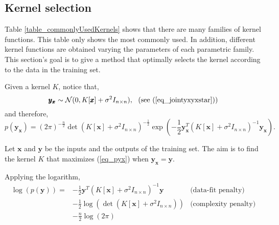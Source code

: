 \subsection{Kernel selection} \label{sec_kernelSelection}

Table \ref{table_commonlyUsedKernels} shows that there are many families of kernel functions. 
This table only shows the most commonly used. 
In addition, different kernel functions are obtained varying the parameters of each parametric family.%
This section's goal is to give a method that optimally selects the kernel according to the data in the training set.

Given a kernel $K$, notice that, %
\begin{equation*}%
  \pmb{y}_{\pmb{x}} \sim \mathcal{N}(0, K[\pmb{x}] + \sigma^2 I_{n \times n}),
 \ \ \text{(see (\ref{eq_jointyxyxstar}))}
\end{equation*}
and therefore,
\begin{equation} \label{eq_pyx}
  p(\pmb{y}_{\pmb{x}}) = (2\pi)^{-\frac{n}{2}}
       \det(K[\pmb{x}] + \sigma^2 I_{n \times n})^{-\frac{1}{2}}
       \exp\left(
           -\frac{1}{2}
           \pmb{y}_{\pmb{x}}^T
           (K[\pmb{x}] + \sigma^2 I_{n \times n})^{-1}
           \pmb{y}_{\pmb{x}}
           \right).
\end{equation}

Let $\pmb{x}$ and $\pmb{y}$ be the inputs and the outputs of the training set. The aim is to find the kernel $K$ that maximizes (\ref{eq_pyx}) when $\pmb{y}_{\pmb{x}}=\pmb{y}$.

Applying the logarithm,
\begin{equation} \label{eq_logarithmpyx}
 \begin{aligned}
  \log(p(\pmb{y})) = 
           &-\frac{1}{2}
           \pmb{y}^T
           (K[\pmb{x}] + \sigma^2 I_{n \times n})^{-1}
           \pmb{y}
               &\text{(data-fit penalty)}
            \\
           &-\frac{1}{2} 
           \log(\det(K[\pmb{x}] + \sigma^2 I_{n \times n}))%
               &\text{(complexity penalty)}
            \\ 
           &-\frac{n}{2}\log(2\pi) 
            \\
 \end{aligned}
\end{equation}


